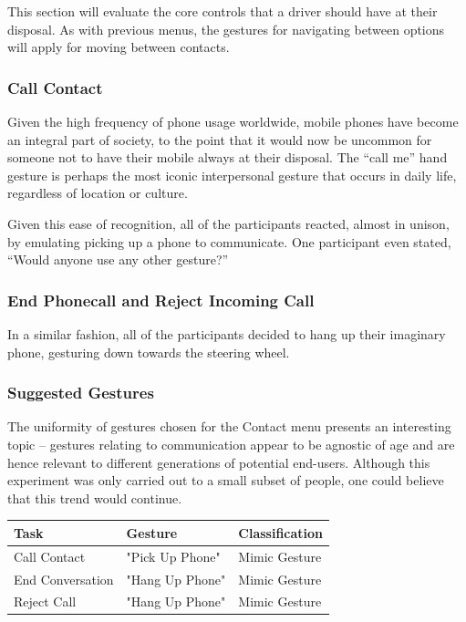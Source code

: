 \documentclass{l4proj}
\begin{document}
This section will evaluate the core controls that a driver should have at their disposal. As with previous menus, the gestures for navigating between options will apply for moving between contacts.

\subsubsection{Call Contact}
\vspace{-3mm}
Given the high frequency of phone usage worldwide, mobile phones have become an integral part of society, to the point that it would now be uncommon for someone not to have their mobile always at their disposal. The ``call me'' hand gesture is perhaps the most iconic interpersonal gesture that occurs in daily life, regardless of location or culture.

Given this ease of recognition, all of the participants reacted, almost in unison, by emulating picking up a phone to communicate.  One participant even stated, ``Would anyone use any other gesture?''

\subsubsection{End Phonecall and Reject Incoming Call}
\vspace{-3mm}
In a similar fashion, all of the participants decided to hang up their imaginary phone, gesturing down towards the steering wheel. 

\subsubsection{Suggested Gestures}
\vspace{-3mm}
The uniformity of gestures chosen for the Contact menu presents an interesting topic -- gestures relating to communication appear to be agnostic of age and are hence relevant to different generations of potential end-users. Although this experiment was only carried out to a small subset of people, one could believe that this trend would continue.

\begin{table}[h!]
\centering
    \begin{tabular}{|l|l|l|}
    \hline
    \textbf{Task}             & \textbf{Gesture}         & \textbf{Classification} \\ \hline
    Call Contact     & "Pick Up Phone" & Mimic Gesture  \\ \hline
    End Conversation & "Hang Up Phone" & Mimic Gesture  \\ \hline
    Reject Call      & "Hang Up Phone" & Mimic Gesture  \\ \hline
    \end{tabular}
\end{table}
\end{document}
